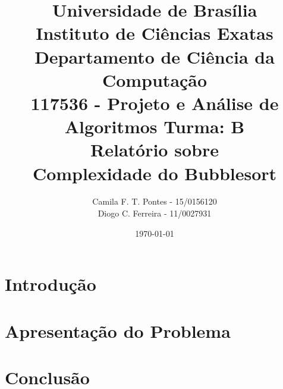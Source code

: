 \documentclass[12pt]{article}
\title{{\large Universidade de Brasília \\ Instituto de Ciências Exatas \\
Departamento de Ciência da Computação} \\[1cm]
117536 - Projeto e Análise de Algoritmos Turma: B\\[.5cm]
Relatório sobre {\\ \bf Complexidade do Bubblesort}}
\author{Camila F. T. Pontes - 15/0156120 \\
        Diogo C. Ferreira - 11/0027931}
\date{\today}
\begin{document}
\maketitle

\section{Introdução}


\section{Apresentação do Problema}





\section{Conclusão}


\clearpage



\end{document}
